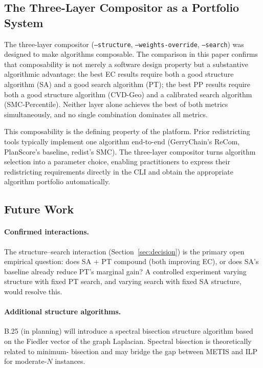 \subsection{The Three-Layer Compositor as a Portfolio System}

The three-layer compositor (\texttt{--structure}, \texttt{--weights-override},
\texttt{--search}) was designed to make algorithms composable.
The comparison in this paper confirms that composability is not merely
a software design property but a substantive algorithmic advantage:
the best EC results require both a good structure algorithm (SA) and a
good search algorithm (PT); the best PP results require both a good structure
algorithm (CVD-Geo) and a calibrated search algorithm (SMC-Percentile).
Neither layer alone achieves the best of both metrics simultaneously, and
no single combination dominates all metrics.

This composability is the defining property of the platform.
Prior redistricting tools typically implement one algorithm end-to-end
(GerryChain's ReCom, PlanScore's baseline, redist's SMC).
The three-layer compositor turns algorithm selection into a parameter choice,
enabling practitioners to express their redistricting requirements directly
in the CLI and obtain the appropriate algorithm portfolio automatically.

\subsection{Future Work}

\paragraph{Confirmed interactions.}
The structure--search interaction (Section~\ref{sec:decision}) is the primary
open empirical question: does SA + PT compound (both improving EC), or does
SA's baseline already reduce PT's marginal gain?
A controlled experiment varying structure with fixed PT search, and varying
search with fixed SA structure, would resolve this.

\paragraph{Additional structure algorithms.}
B.25 (in planning) will introduce a spectral bisection structure algorithm
based on the Fiedler vector of the graph Laplacian.
Spectral bisection is theoretically related to minimum-\ec{} bisection and
may bridge the gap between METIS and ILP for moderate-$N$ instances.

